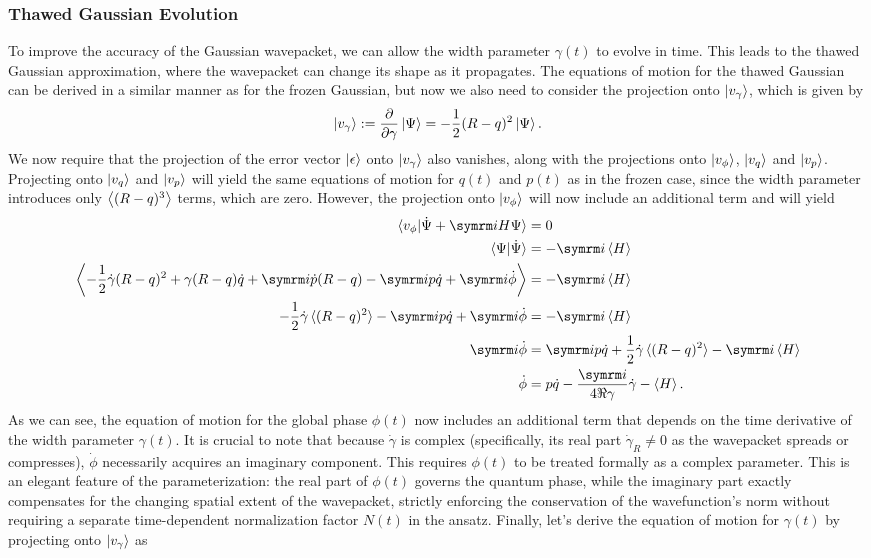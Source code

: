 \subsubsection{Thawed Gaussian Evolution}
To improve the accuracy of the Gaussian wavepacket, we can allow the width parameter $\gamma(t)$ to evolve in time. This leads to the thawed Gaussian approximation, where the wavepacket can change its shape as it propagates. The equations of motion for the thawed Gaussian can be derived in a similar manner as for the frozen Gaussian, but now we also need to consider the projection onto $\ket{v_\gamma}$, which is given by
\begin{equation}\label{eq:gaussian_derivative_gamma}
\ket{v_\gamma}:=\frac{\partial}{\partial \gamma}\ket{\Psi}=-\frac{1}{2}(R-q)^2\ket{\Psi}.
\end{equation}
We now require that the projection of the error vector $\ket{\epsilon}$ onto $\ket{v_\gamma}$ also vanishes, along with the projections onto $\ket{v_\phi}$, $\ket{v_q}$ and $\ket{v_p}$. Projecting onto $\ket{v_q}$ and $\ket{v_p}$ will yield the same equations of motion for $q(t)$ and $p(t)$ as in the frozen case, since the width parameter introduces only $\Braket{(R-q)^3}$ terms, which are zero. However, the projection onto $\ket{v_\phi}$ will now include an additional term and will yield
\begin{align}
\braket{v_\phi|\dot\Psi+\i H\Psi}&=0\\
\braket{\Psi|\dot\Psi}&=-\i\braket{H}\\
\Braket{-\frac{1}{2}\dot\gamma(R-q)^2+\gamma(R-q)\dot q+\i\dot p(R-q)-\i p\dot q+\i\dot\phi}&=-\i\braket{H}\\
-\frac{1}{2}\dot\gamma\braket{(R-q)^2}-\i p\dot q+\i\dot\phi&=-\i\braket{H}\\
\i\dot\phi&=\i p\dot q+\frac{1}{2}\dot\gamma\braket{(R-q)^2}-\i\braket{H}\\
\dot\phi&=p\dot q-\frac{\i}{4\Re\gamma}\dot\gamma-\braket{H}.
\end{align}
As we can see, the equation of motion for the global phase $\phi(t)$ now includes an additional term that depends on the time derivative of the width parameter $\gamma(t)$. It is crucial to note that because $\dot\gamma$ is complex (specifically, its real part $\dot\gamma_R\neq 0$ as the wavepacket spreads or compresses), $\dot\phi$ necessarily acquires an imaginary component. This requires $\phi(t)$ to be treated formally as a complex parameter. This is an elegant feature of the parameterization: the real part of $\phi(t)$ governs the quantum phase, while the imaginary part exactly compensates for the changing spatial extent of the wavepacket, strictly enforcing the conservation of the wavefunction's norm without requiring a separate time-dependent normalization factor $N(t)$ in the ansatz. Finally, let's derive the equation of motion for $\gamma(t)$ by projecting onto $\ket{v_\gamma}$ as
